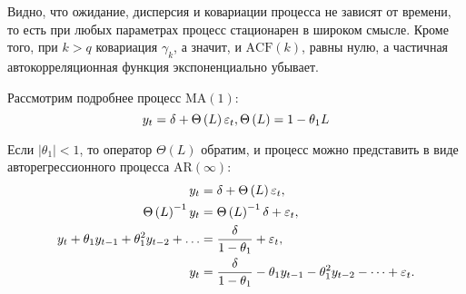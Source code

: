 Видно, что ожидание, дисперсия и ковариации процесса не зависят от времени, то есть при любых параметрах процесс стационарен в широком смысле.
Кроме того, при $k > q$ ковариация $\gamma_k$, а значит, и $\mathrm{ACF}\left( k \right)$, равны нулю, а частичная автокорреляционная функция экспоненциально убывает.

Рассмотрим подробнее процесс $\mathrm{MA}\left( 1 \right)$:
\begin{equation*}
    y_t = \delta + \Theta\left( L \right) \eps_t,  %
    \Theta\left( L \right) = 1 - \theta_1 L
\end{equation*}

Если $|\theta_1| < 1$, то оператор $\Theta\left( L \right)$ обратим, и процесс можно представить в виде авторегрессионного процесса $\mathrm{AR}\left( \infty \right)$:
\begin{align*}
    y_t &= \delta + \Theta\left( L \right) \varepsilon_t,\\
    \Theta\left( L \right)^{-1} y_t &= \Theta\left( L \right)^{-1} \delta + \varepsilon_t,\\
    y_t + \theta_1 y_{t-1} + \theta_1^2 y_{t-2} + \dots &= \frac{\delta}{1 - \theta_1} + \varepsilon_t, \\
    y_t &= \frac{\delta}{1 - \theta_1} - \theta_1 y_{t-1} - \theta_1^2 y_{t-2} - \dots + \varepsilon_t.
\end{align*}

